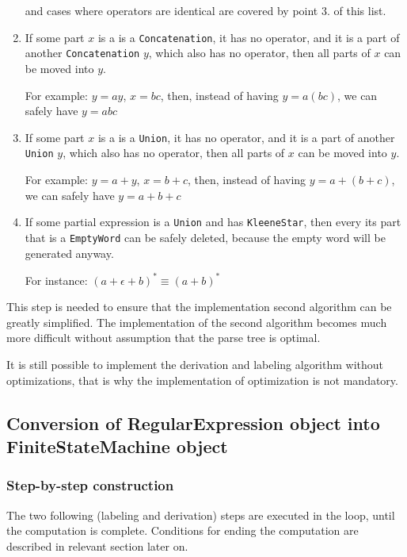 \documentclass{article}
\begin{document}
\begin{enumerate}
  \vspace{10pt}
  and cases where operators are identical are covered by point 3. of this list.

  \item If some part $x$ is a is a \verb|Concatenation|, it has no operator, and it is a part of
  another \verb|Concatenation| $y$, which also has no operator, then all parts of $x$ can be moved
  into $y$.

  For example: $y = ay$, $x = bc$, then, instead of having $y = a(bc)$, we can safely have $y = abc$

  \item If some part $x$ is a is a \verb|Union|, it has no operator, and it is a part of another
  \verb|Union| $y$, which also has no operator, then all parts of $x$ can be moved into $y$.

  For example: $y = a+y$, $x = b+c$, then, instead of having $y = a+(b+c)$, we can safely have $y =
  a+b+c$

  \item If some partial expression is a \verb|Union| and has \verb|KleeneStar|, then every its part
  that is a \verb|EmptyWord| can be safely deleted, because the empty word will be generated
  anyway.

  For instance: $(a+\epsilon+b)^* \equiv (a+b)^*$

\end{enumerate}

This step is needed to ensure that the implementation second algorithm can be greatly simplified.
The implementation of the second algorithm becomes much more difficult without assumption that the
parse tree is optimal.

It is still possible to implement the derivation and labeling algorithm without optimizations, that
is why the implementation of optimization is not mandatory.

\newpage

\subsection{Conversion of RegularExpression object into FiniteStateMachine object}

\subsubsection{Step-by-step construction}

The two following (labeling and derivation) steps are executed in the loop, until the computation is
complete. Conditions for ending the computation are described in relevant section later on.
\end{document}
